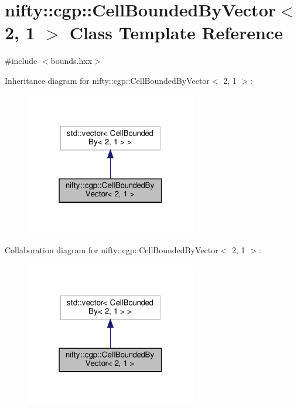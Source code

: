 \hypertarget{classnifty_1_1cgp_1_1CellBoundedByVector_3_012_00_011_01_4}{}\section{nifty\+:\+:cgp\+:\+:Cell\+Bounded\+By\+Vector$<$ 2, 1 $>$ Class Template Reference}
\label{classnifty_1_1cgp_1_1CellBoundedByVector_3_012_00_011_01_4}


{\ttfamily \#include $<$bounds.\+hxx$>$}



Inheritance diagram for nifty\+:\+:cgp\+:\+:Cell\+Bounded\+By\+Vector$<$ 2, 1 $>$\+:
\nopagebreak
\begin{figure}[H]
\begin{center}
\leavevmode
\includegraphics[width=211pt]{classnifty_1_1cgp_1_1CellBoundedByVector_3_012_00_011_01_4__inherit__graph}
\end{center}
\end{figure}


Collaboration diagram for nifty\+:\+:cgp\+:\+:Cell\+Bounded\+By\+Vector$<$ 2, 1 $>$\+:
\nopagebreak
\begin{figure}[H]
\begin{center}
\leavevmode
\includegraphics[width=211pt]{classnifty_1_1cgp_1_1CellBoundedByVector_3_012_00_011_01_4__coll__graph}
\end{center}
\end{figure}
